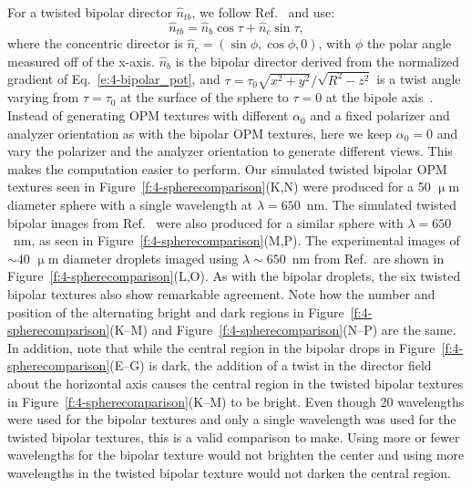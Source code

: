 For a twisted bipolar director $\hat{n}_{tb}$, we follow Ref.~\cite{RN177} and use:
\begin{equation}
\hat{n}_{tb} = \hat{n}_{b}\cos\tau +\hat{n}_{c}\sin\tau,
\end{equation}
where the concentric director is $\hat{n}_{c} = (\sin \phi,\cos \phi,0)$, with $\phi$ the polar angle measured off of the x-axis.
$\hat{n}_b$ is the bipolar director derived from the normalized gradient of Eq.~\ref{e:4-bipolar_pot}, and $\tau = \tau_0\sqrt{x^2+y^2}/\sqrt{R^2-z^2}$ is a twist angle varying from $\tau=\tau_0$ at the surface of the sphere to $\tau=0$ at the bipole axis~\cite{RN177}.
Instead of generating OPM textures with different $\alpha_0$ and a fixed polarizer and analyzer orientation as with the bipolar OPM textures, here we keep $\alpha_0=0$ and vary the polarizer and the analyzer orientation to generate different views.
This makes the computation easier to perform. Our simulated twisted bipolar OPM textures seen in Figure~\ref{f:4-spherecomparison}(K,N) were produced for a 50 $\upmu$m diameter sphere with a single wavelength at $\lambda = 650$~nm.
The simulated twisted bipolar images from Ref.~\cite{RN193} were also produced for a similar sphere with $\lambda = 650$~nm, as seen in Figure~\ref{f:4-spherecomparison}(M,P).
The experimental images of $\sim 40$ $\upmu$m diameter droplets imaged using $\lambda \sim 650$~nm from Ref.~\cite{RN193}are shown in Figure~\ref{f:4-spherecomparison}(L,O).
As with the bipolar droplets, the six twisted bipolar textures also show remarkable agreement.
Note how the number and position of the alternating bright and dark regions in Figure~\ref{f:4-spherecomparison}(K--M) and Figure~\ref{f:4-spherecomparison}(N--P) are the same.
In addition, note that while the central region in the bipolar drops in Figure~\ref{f:4-spherecomparison}(E--G) is dark, the addition of a twist in the director field about the horizontal axis causes the central region in the twisted bipolar textures in Figure~\ref{f:4-spherecomparison}(K--M) to be bright.
Even though 20 wavelengths were used for the bipolar textures and only a single wavelength was used for the twisted bipolar textures, this is a valid comparison to make.
Using more or fewer wavelengths for the bipolar texture would not brighten the center and using more wavelengths in the twisted bipolar texture would not darken the central region.


